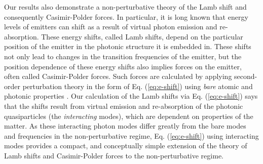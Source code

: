 \documentclass[aps,prl,twocolumn,
	groupedaddress,superscriptaddress,
	amsfonts,amssymb,amsmath,floatfix,
	citeautoscript]{revtex4-1}
\begin{document}

Our results also demonstrate a non-perturbative theory of the Lamb shift and consequently Casimir-Polder forces. In particular, it is long known that energy levels of emitters can shift as a result of virtual photon emission and re-absorption. These energy shifts, called Lamb shifts, depend on the particular position of the emitter in the photonic structure it is embedded in. These shifts not only lead to changes in the transition frequencies of the emitter, but the position dependence of these energy shifts also implies forces on the emitter, often called Casimir-Polder forces. Such forces are calculated by applying second-order perturbation theory in the form of Eq. (\ref{eq:e-shift}) using \textit{bare} atomic and photonic properties \cite{scheel2009macroscopic}. Our calculation of the Lamb shifts via Eq. (\ref{eq:e-shift}) says that the shifts result from virtual emission and re-absorption of the photonic quasiparticles (the \textit{interacting} modes), which are dependent on properties of the matter. As these interacting photon modes differ greatly from the bare modes and frequencies in the non-perturbative regime, Eq. (\ref{eq:e-shift}) using interacting modes provides a compact, and conceptually simple extension of the theory of Lamb shifts and Casimir-Polder forces to the non-perturbative regime.
\end{document}
